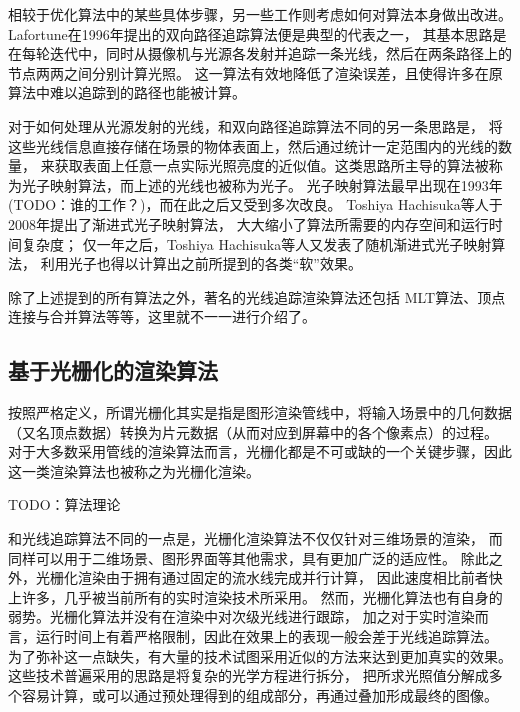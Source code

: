 相较于优化算法中的某些具体步骤，另一些工作则考虑如何对算法本身做出改进。
Lafortune在1996年提出的双向路径追踪算法\cite{BidirectionalPathTracing}便是典型的代表之一，
其基本思路是在每轮迭代中，同时从摄像机与光源各发射并追踪一条光线，然后在两条路径上的节点两两之间分别计算光照。
这一算法有效地降低了渲染误差，且使得许多在原算法中难以追踪到的路径也能被计算。

对于如何处理从光源发射的光线，和双向路径追踪算法不同的另一条思路是，
将这些光线信息直接存储在场景的物体表面上，然后通过统计一定范围内的光线的数量，
来获取表面上任意一点实际光照亮度的近似值。这类思路所主导的算法被称为光子映射算法，而上述的光线也被称为光子。
光子映射算法最早出现在1993年(TODO：谁的工作？)，而在此之后又受到多次改良。
Toshiya Hachisuka等人于2008年提出了渐进式光子映射算法\cite{ProgressivePhotonMapping}，
大大缩小了算法所需要的内存空间和运行时间复杂度；
仅一年之后，Toshiya Hachisuka等人又发表了随机渐进式光子映射算法\cite{StochasticProgressivePhotonMapping}，
利用光子也得以计算出之前所提到的各类“软”效果。

除了上述提到的所有算法之外，著名的光线追踪渲染算法还包括
MLT算法、顶点连接与合并算法等等，这里就不一一进行介绍了。


\subsection{基于光栅化的渲染算法}

按照严格定义，所谓光栅化其实是指是图形渲染管线中，将输入场景中的几何数据（又名顶点数据）转换为片元数据（从而对应到屏幕中的各个像素点）的过程。
对于大多数采用管线的渲染算法而言，光栅化都是不可或缺的一个关键步骤，因此这一类渲染算法也被称之为光栅化渲染。

TODO：算法理论

和光线追踪算法不同的一点是，光栅化渲染算法不仅仅针对三维场景的渲染，
而同样可以用于二维场景、图形界面等其他需求，具有更加广泛的适应性。
除此之外，光栅化渲染由于拥有通过固定的流水线完成并行计算，
因此速度相比前者快上许多，几乎被当前所有的实时渲染技术所采用。
然而，光栅化算法也有自身的弱势。光栅化算法并没有在渲染中对次级光线进行跟踪，
加之对于实时渲染而言，运行时间上有着严格限制，因此在效果上的表现一般会差于光线追踪算法。
为了弥补这一点缺失，有大量的技术试图采用近似的方法来达到更加真实的效果。
这些技术普遍采用的思路是将复杂的光学方程进行拆分，
把所求光照值分解成多个容易计算，或可以通过预处理得到的组成部分，再通过叠加形成最终的图像。

